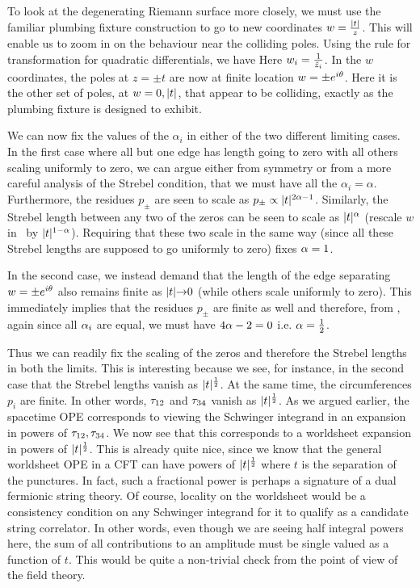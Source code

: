 To look at the degenerating Riemann surface more closely, we must use the 
familiar plumbing fixture construction to go to new coordinates 
$w={|t|\over z}$. This will enable us to zoom in on the behaviour 
near the colliding poles. 
Using the rule for transformation for quadratic differentials, we have 
\eqn{}
Here $w_i={1\over \tilde{z}_i}$.
In the $w$ coordinates, the poles at $z=\pm t$ are now at 
finite location $w=\pm e^{i{\theta}}$. Here it is the other set of poles, at 
$w=0,|t|$, that appear to be colliding, exactly as the plumbing fixture
is designed to exhibit. 

We can now fix the values of the $\alpha_i$
in either of the two different limiting cases. In the first case 
where all but one edge has length going to zero with all others scaling 
uniformly to zero, we can argue either from symmetry or from a more 
careful analysis of the Strebel condition, that we must have all the 
$\alpha_i=\alpha$. Furthermore, the residues $p_{\pm}$ are seen to scale as 
$p_{\pm}\propto|t|^{2\alpha -1}$. Similarly, the Strebel length between 
any two of the zeros can be seen to scale as $|t|^{{\alpha}}$ (rescale $w$
in \wqd\ by $|t|^{1-{\alpha}}$). Requiring that these two scale in the same way 
(since all these Strebel lengths are supposed to go uniformly to zero)
fixes ${\alpha}=1$. 

In the second case, we instead demand that the length of the edge separating 
$w=\pm e^{i{\theta}}$ also remains finite as $|t| {\rightarrow} 0$ (while others
scale uniformly to zero). This immediately 
implies that the residues $p_{\pm}$ are finite as well 
and therefore, from  \wqd , again since
all ${\alpha}_i$ are equal, we must have $4{\alpha}-2=0$ i.e. ${\alpha}={1\over 2}$. 

Thus we can readily fix the scaling of the zeros and therefore the Strebel 
lengths in both the limits. This is interesting because we see, for instance,
in the second case that the Strebel lengths vanish as $|t|^{1\over 2}$.
At the same time, the circumferences $p_i$ are finite. 
In other words, ${\tau}_{12}$ and ${\tau}_{34}$ vanish as $|t|^{1\over 2}$. 
As we argued earlier, the spacetime OPE corresponds to viewing 
the Schwinger integrand in an expansion in powers of ${\tau}_{12},{\tau}_{34}$.
We now see that this corresponds to a worldsheet expansion in powers of 
$|t|^{1\over 2}$. This is already quite nice, since we know that the general
worldsheet OPE in a CFT can have powers of $|t|^{1\over 2}$ where $t$ is
the separation of the punctures. In fact, such a fractional power is perhaps a 
signature of a dual fermionic string theory. Of course, locality on the 
worldsheet would be a consistency condition on any
Schwinger integrand for it to qualify as a candidate string correlator. 
In other words, even though we are seeing half integral powers here, 
the sum of all contributions to an amplitude must
be single valued as a function of $t$. This 
would be quite a non-trivial check from 
the point of view of the field theory. 

